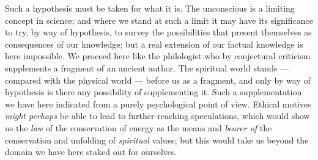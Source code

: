 \documentclass[12pt,a4paper]{book}
\newcommand{\opage}[1]{\marginnote{\footnotesize\textit{[#1]}}}
\begin{document}
Such a hypothesis must be taken for what it is. The unconscious is a
limiting concept in science; and where we stand at such a limit it may
have its significance to try, by way of
\opage{100}hypothesis, to survey the possibilities that present themselves
as consequences of our knowledge; but a real extension of our factual
knowledge is here impossible. We proceed here like the philologist who
by conjectural criticism supplements a fragment of an ancient author. The
spiritual world stands --- compared with the physical world --- before us
as a fragment, and only by way of hypothesis is there any possibility of
supplementing it. Such a supplementation we have here indicated from a
purely psychological point of view. Ethical motives \emph{might perhaps}
be able to lead to further-reaching speculations, which would show us the
\emph{law} of the conservation of energy as the means and \emph{bearer of}
the conservation and unfolding of \emph{spiritual} values; but this
would take us beyond the domain we have here staked out for ourselves.
\end{document}
